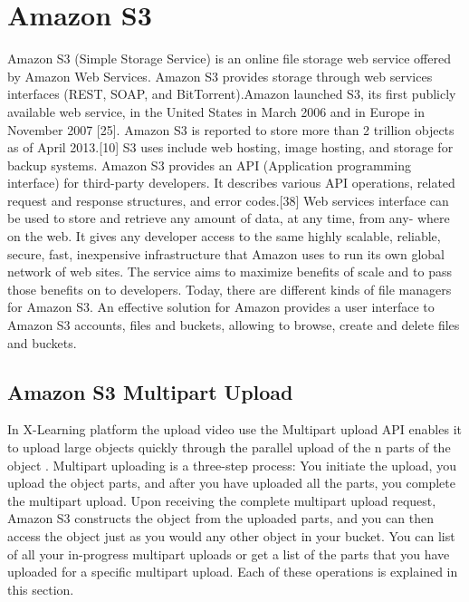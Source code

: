 \section{Amazon S3}
\label{sec:Amazon S3}

Amazon S3 (Simple Storage Service) is an online file storage web service offered by Amazon Web Services. Amazon S3 provides storage through web services interfaces (REST, SOAP, and BitTorrent).Amazon launched S3, its first publicly available web service, in the United States in March 2006 and in Europe in November 2007 [25].
Amazon S3 is reported to store more than 2 trillion objects as of April 2013.[10] S3 uses include web hosting, image hosting, and storage for backup systems.  Amazon S3 provides an API (Application programming interface) for third-party developers. It describes various API operations, related request and response structures, and error codes.[38] Web services interface can be used to store and retrieve any amount of data, at any time, from any- where on the web. It gives any developer access to the same highly scalable, reliable, secure, fast, inexpensive infrastructure that Amazon uses to run its own global network of web sites. The service aims to maximize benefits of scale and to pass those benefits on to developers. Today, there are different kinds of file managers for Amazon S3. An effective solution for Amazon provides a user interface to Amazon S3 accounts, files and buckets, allowing to browse, create and delete files and buckets.

\subsection{Amazon S3 Multipart Upload}
\label{subsec:amazon_S3_multipart_upload_initiation}


In X-Learning platform the upload video use the Multipart upload API enables it to upload large objects quickly through the parallel upload of the n    parts of the object .
Multipart uploading is a three-step process: You initiate the upload, you upload the object parts, and after you have uploaded all the parts, you complete the multipart upload. Upon receiving the complete multipart upload request, Amazon S3 constructs the object from the uploaded parts, and you can then access the object just as you would any other object in your bucket.
You can list of all your in-progress multipart uploads or get a list of the parts that you have uploaded for a specific multipart upload. Each of these operations is explained in this section.


